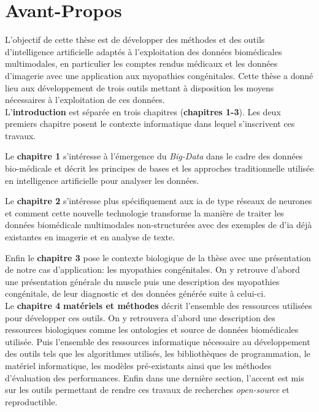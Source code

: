 \chapter{Avant-Propos}
L'objectif de cette thèse est de développer des méthodes et des outils d'intelligence artificielle adaptés à l'exploitation des données biomédicales multimodales, en particulier les comptes rendus médicaux et les données d'imagerie avec une application aux myopathies congénitales. Cette thèse a donné lieu aux développement de trois outils mettant à disposition les moyens nécessaires à l'exploitation de ces données. \\


L'\textbf{introduction} est séparée en trois chapitres (\textbf{chapitres 1-3}). Les deux premiers chapitre posent le contexte informatique dans lequel s'inscrivent ces travaux. 

Le \textbf{chapitre 1} s'intéresse à l'émergence du \textit{Big-Data} dans le cadre des données bio-médicale et décrit les principes de bases et les approches traditionnelle utilisée en intelligence artificielle pour analyser les données.

Le \textbf{chapitre 2} s'intéresse plus spécifiquement aux \gls{ia} de type réseaux de neurones et comment cette nouvelle technologie transforme la manière de traiter les données biomédicale multimodales non-structurées avec des exemples de d'\gls{ia} déjà existantes en imagerie et en analyse de texte.

Enfin le \textbf{chapitre 3} pose le contexte biologique de la thèse avec une présentation de notre cas d'application: les myopathies congénitales. On y retrouve d'abord une présentation générale du muscle puis une description des myopathies congénitale, de leur diagnostic et des données générée suite à celui-ci. \\


Le \textbf{chapitre 4} \textbf{matériels et méthodes} décrit l'ensemble des ressources utilisées pour développer ces outils. On y retrouvera d'abord une description des ressources biologiques comme les ontologies et source de données biomédicales utilisée. Puis l'ensemble des ressources informatique nécessaire au développement des outils tels que les algorithmes utilisés, les bibliothèques de programmation, le matériel informatique, les modèles pré-existants ainsi que les méthodes d'évaluation des performances. Enfin dans une dernière section, l'accent est mis sur les outils permettant de rendre ces travaux de recherches \textit{open-source} et reproductible. \\


